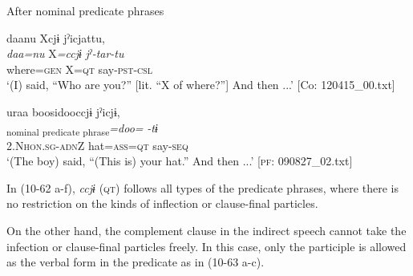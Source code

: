 \begin{xlist}
  \exi{} After nominal predicate phrases

  \ex  %
      \glll    daanu  Xcjɨ  jˀicjattu,\\
      \textit{daa=nu}  X\textit{=ccjɨ}  \textit{jˀ-tar-tu}\\
      where=\textsc{gen}  X=\textsc{qt}  say-\textsc{pst}-\textsc{csl}\\
      \glt       ‘(I) said, “Who are you?” [lit. “X of where?”] And then ...’ [Co: 120415\_00.txt]

  \ex %
      \glll    uraa  {\textbar}boosi{\textbar}dooccjɨ  jˀicjɨ,\\
      [\textit{ura-a}  \textit{boosi}]\textsubscript{nominal predicate phrase}\textit{=doo=}  \textit{-tɨ}\\
      2.N\textsc{hon}.\textsc{sg}-\textsc{adn}Z  hat=\textsc{ass}=\textsc{qt}  say-\textsc{seq}\\
      \glt       ‘(The boy) said, “(This is) your hat.” And then ...’ [\textsc{pf}: 090827\_02.txt]
  \end{xlist}
\z

In (10-62 a-f), \textit{ccjɨ} (\textsc{qt}) follows all types of the predicate phrases, where there is no restriction on the kinds of inflection or clause-final particles.

On the other hand, the complement clause in the indirect speech cannot take the infection or clause-final particles freely. In this case, only the participle is allowed as the verbal form in the predicate as in (10-63 a-c).

